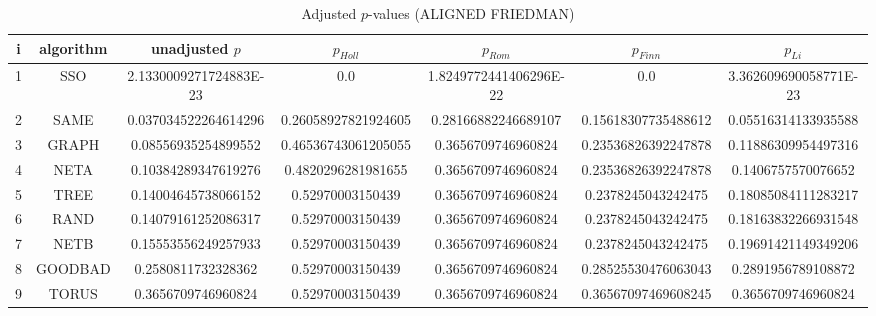 \documentclass[a4paper,10pt]{article}
\begin{document}
\begin{landscape}
\begin{table}[!htp]
\centering\scriptsize
\caption{Adjusted $p$-values (ALIGNED FRIEDMAN)}
\begin{tabular}{ccccccc}
i&algorithm&unadjusted $p$&$p_{Holl}$&$p_{Rom}$&$p_{Finn}$&$p_{Li}$\\
\hline
1& SSO&2.1330009271724883E-23&0.0&1.8249772441406296E-22&0.0&3.362609690058771E-23\\
2& SAME&0.037034522264614296&0.26058927821924605&0.28166882246689107&0.15618307735488612&0.05516314133935588\\
3& GRAPH&0.08556935254899552&0.46536743061205055&0.3656709746960824&0.23536826392247878&0.11886309954497316\\
4& NETA&0.10384289347619276&0.4820296281981655&0.3656709746960824&0.23536826392247878&0.1406757570076652\\
5& TREE&0.14004645738066152&0.52970003150439&0.3656709746960824&0.2378245043242475&0.18085084111283217\\
6& RAND&0.14079161252086317&0.52970003150439&0.3656709746960824&0.2378245043242475&0.18163832266931548\\
7& NETB&0.15553556249257933&0.52970003150439&0.3656709746960824&0.2378245043242475&0.19691421149349206\\
8& GOODBAD&0.2580811732328362&0.52970003150439&0.3656709746960824&0.28525530476063043&0.2891956789108872\\
9& TORUS&0.3656709746960824&0.52970003150439&0.3656709746960824&0.36567097469608245&0.3656709746960824\\
\hline
\end{tabular}
\end{table}


\newpage


\end{landscape}
\end{document}
